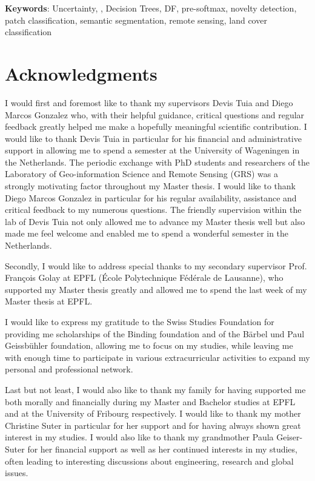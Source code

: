 \documentclass[10pt]{article}
\begin{document}
\textbf{Keywords}: Uncertainty, , Decision Trees, \acrlong{DF}, pre-softmax, novelty detection, patch classification, semantic segmentation, remote sensing, land cover classification
\vfill
\newpage

\thispagestyle{empty}
\section*{Acknowledgments}
I would first and foremost like to thank my supervisors Devis Tuia and Diego Marcos Gonzalez who, with their helpful guidance, critical questions and regular feedback greatly helped me make a hopefully meaningful scientific contribution. I would like to thank Devis Tuia in particular for his financial and administrative support in allowing me to spend a semester at the University of Wageningen in the Netherlands. The periodic exchange with PhD students and researchers of the Laboratory of Geo-information Science and Remote Sensing (GRS) was a strongly motivating factor throughout my Master thesis. I would like to thank Diego Marcos Gonzalez in particular for his regular availability, assistance and critical feedback to my numerous questions. The friendly supervision within the lab of Devis Tuia not only allowed me to advance my Master thesis well but also made me feel welcome and enabled me to spend a wonderful semester in the Netherlands.

Secondly, I would like to address special thanks to my secondary supervisor Prof. François Golay at EPFL (École Polytechnique Fédérale de Lausanne), who supported my Master thesis greatly and allowed me to spend the last week of my Master thesis at EPFL.

I would like to express my gratitude to the Swiss Studies Foundation for providing me scholarships of the Binding foundation and of the Bärbel und Paul Geissbühler foundation, allowing me to focus on my studies, while leaving me with enough time to participate in various extracurricular activities to expand my personal and professional network.

Last but not least, I would also like to thank my family for having supported me both morally and financially during my Master and Bachelor studies at EPFL and at the University of Fribourg respectively. I would like to thank my mother Christine Suter in particular for her support and for having always shown great interest in my studies. I would also like to thank my grandmother Paula Geiser-Suter for her financial support as well as her continued interests in my studies, often leading to interesting discussions about engineering, research and global issues.
\end{document}
